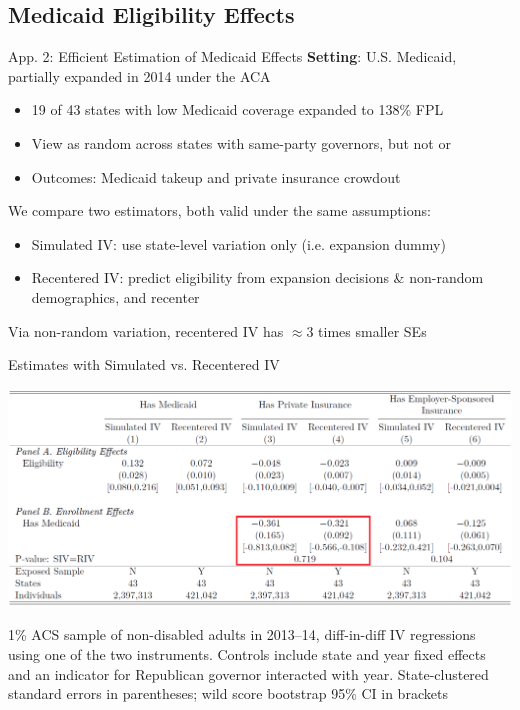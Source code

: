 \documentclass{beamer}
\begin{document}
\subsection{Medicaid Eligibility Effects}
\begin{frame}[label=ACA]{App. 2: Efficient Estimation of Medicaid Effects}
\vspace{-0.1cm}
\textbf{Setting}: U.S. Medicaid, partially expanded in 2014 under the ACA
\vspace{0.1cm}
	\begin{itemize}
	\item 19 of 43 states with low Medicaid coverage expanded to 138\% FPL

	\item View  as random across states with same-party governors, but not  or 

	\item Outcomes: Medicaid takeup and private insurance crowdout
\end{itemize}
\pause
We compare two estimators, both valid under the same assumptions:
\begin{itemize}
	\item Simulated IV: use state-level variation only (i.e. expansion dummy)
	\item Recentered IV: predict eligibility from expansion decisions \& non-random demographics, and recenter
\end{itemize}

\pause
Via non-random variation, recentered IV has $\approx 3$ times smaller SEs
\end{frame}

\begin{frame}{Estimates with Simulated vs. Recentered IV}
	\begin{center}
	\includegraphics[width=1\textwidth]{lecture_includes/aca_ss.png}
	\end{center}

\footnotesize{1\% ACS sample of non-disabled adults in 2013--14, diff-in-diff IV regressions using one of the two instruments. Controls include state and year fixed effects and an indicator for Republican governor interacted with year. State-clustered standard errors in parentheses; wild score bootstrap 95\% CI in brackets} 
\end{frame}
\end{document}

